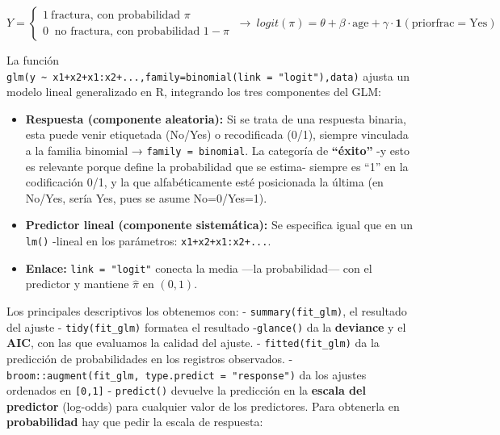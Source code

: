 \documentclass[
  letterpaper,
  DIV=11,
  numbers=noendperiod]{scrartcl}
\providecommand{\tightlist}{%
  \setlength{\itemsep}{0pt}\setlength{\parskip}{0pt}}\usepackage{longtable,booktabs,array}
\begin{document}
\[Y=\begin{cases} 1 \ \text{fractura, con probabilidad } \pi \\
0 \ \text{ no fractura, con probabilidad } 1-\pi
\end{cases} \ \rightarrow \ logit(\pi)=\theta + \beta \cdot \text{age} + \gamma \cdot \mathbf{1}(\text{priorfrac}=\text{Yes})
\]

\begin{tcolorbox}[enhanced jigsaw, breakable, colframe=quarto-callout-tip-color-frame, left=2mm, arc=.35mm, colbacktitle=quarto-callout-tip-color!10!white, toprule=.15mm, colback=white, coltitle=black, rightrule=.15mm, opacitybacktitle=0.6, title=\textcolor{quarto-callout-tip-color}{\faLightbulb}\hspace{0.5em}{🔧 En R. El \texttt{glm()} con datos binarios}, titlerule=0mm, toptitle=1mm, bottomtitle=1mm, leftrule=.75mm, bottomrule=.15mm, opacityback=0]

La función
\texttt{glm(y\ \textasciitilde{}\ x1+x2+x1:x2+...,family=binomial(link\ =\ "logit"),data)}
ajusta un modelo lineal generalizado en R, integrando los tres
componentes del GLM:

\begin{itemize}
\tightlist
\item
  \textbf{Respuesta (componente aleatoria):} Si se trata de una
  respuesta binaria, esta puede venir etiquetada (No/Yes) o recodificada
  (0/1), siempre vinculada a la familia binomial →
  \texttt{family\ =\ binomial}. La categoría de \textbf{``éxito''} -y
  esto es relevante porque define la probabilidad que se estima- siempre
  es ``1'' en la codificación 0/1, y la que alfabéticamente esté
  posicionada la última (en No/Yes, sería Yes, pues se asume
  No=0/Yes=1).
\item
  \textbf{Predictor lineal (componente sistemática):} Se especifica
  igual que en un \texttt{lm()} -lineal en los parámetros:
  \texttt{x1+x2+x1:x2+...}.
\item
  \textbf{Enlace:} \texttt{link\ =\ "logit"} conecta la media ---la
  probabilidad--- con el predictor y mantiene \(\hat\pi\) en \((0,1)\).
\end{itemize}

Los principales descriptivos los obtenemos con: -
\texttt{summary(fit\_glm)}, el resultado del ajuste -
\texttt{tidy(fit\_glm)} formatea el resultado -\texttt{glance()} da la
\textbf{deviance} y el \textbf{AIC}, con las que evaluamos la calidad
del ajuste. - \texttt{fitted(fit\_glm)} da la predicción de
probabilidades en los registros observados. -
\texttt{broom::augment(fit\_glm,\ type.predict\ =\ "response")} da los
ajustes ordenados en \texttt{{[}0,1{]}} - \texttt{predict()} devuelve la
predicción en la \textbf{escala del predictor} (log-odds) para cualquier
valor de los predictores. Para obtenerla en \textbf{probabilidad} hay
que pedir la escala de respuesta:


\end{tcolorbox}
\end{document}
